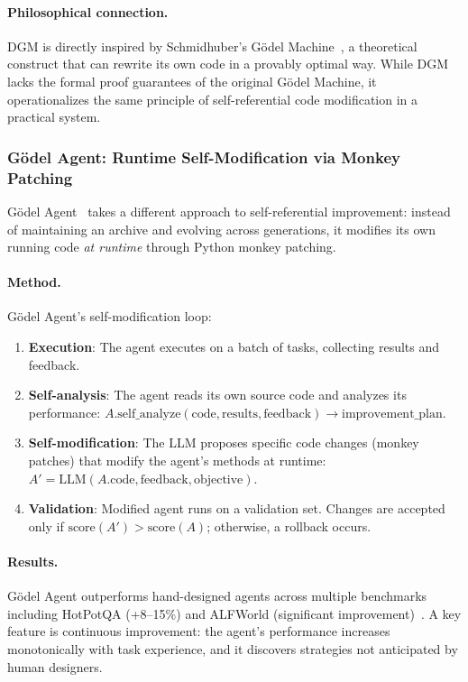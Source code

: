 \paragraph{Philosophical connection.}
DGM is directly inspired by Schmidhuber's G\"odel Machine~\citep{schmidhuber2003godel}, a theoretical construct that can rewrite its own code in a provably optimal way. While DGM lacks the formal proof guarantees of the original G\"odel Machine, it operationalizes the same principle of self-referential code modification in a practical system.

\subsubsection{G\"odel Agent: Runtime Self-Modification via Monkey Patching}
\label{sec:godel-agent-detail}

G\"odel Agent~\citep{yin2025godelagent} takes a different approach to self-referential improvement: instead of maintaining an archive and evolving across generations, it modifies its own running code \emph{at runtime} through Python monkey patching.

\paragraph{Method.}
G\"odel Agent's self-modification loop:
\begin{enumerate}
    \item \textbf{Execution}: The agent executes on a batch of tasks, collecting results and feedback.
    \item \textbf{Self-analysis}: The agent reads its own source code and analyzes its performance: $A.\text{self\_analyze}(\text{code}, \text{results}, \text{feedback}) \rightarrow \text{improvement\_plan}$.
    \item \textbf{Self-modification}: The LLM proposes specific code changes (monkey patches) that modify the agent's methods at runtime: $A' = \text{LLM}(A.\text{code}, \text{feedback}, \text{objective})$.
    \item \textbf{Validation}: Modified agent runs on a validation set. Changes are accepted only if $\text{score}(A') > \text{score}(A)$; otherwise, a rollback occurs.
\end{enumerate}

\paragraph{Results.}
G\"odel Agent outperforms hand-designed agents across multiple benchmarks including HotPotQA (+8--15\%) and ALFWorld (significant improvement)~\citep{yin2025godelagent}. A key feature is continuous improvement: the agent's performance increases monotonically with task experience, and it discovers strategies not anticipated by human designers.

